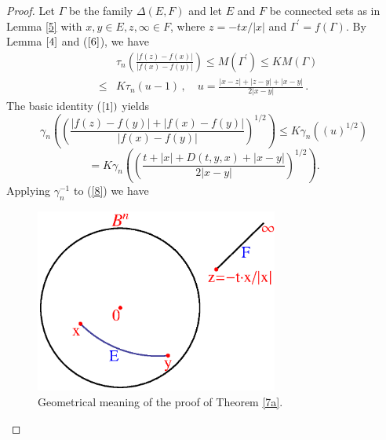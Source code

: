 \documentclass[12pt,a4paper,leqno]{amsart}
\theoremstyle{plain}
\numberwithin{equation}{section}          %
\begin{document}
\begin{proof}
Let $\Gamma$ be the family $\Delta(E,F)$ and let
$E$ and $F$ be
 connected sets as in Lemma \ref{5} with
$x,y\in E,z,\infty \in F$, where $z=-tx/|x|$ and $\Gamma^{'}=f(\Gamma)$.
By Lemma $\ref{4}$ and ($\ref{6}$), we have
\begin{eqnarray*}
& {} &\tau_n\left(\frac{|f(z)-f(x)|}{|f(x)-f(y)|}\right)\leq  M(\Gamma^{'})\leq KM(\Gamma)\\
                                                  &\leq & K\tau_n(u-1)\,, \quad
u=\displaystyle\frac{|x-z|+|z-y|+|x-y|}{2|x-y|}\,.
\end{eqnarray*}
The basic identity ($\ref{1})$ yields
\begin{equation}\label{8}
 \gamma_n\left(\left(\displaystyle\frac{|f(z)-f(y)|+|f(x)-f(y)|}{|f(x)-f(y)|}\right)^{1/2}\right)\leq
K\gamma_n\left(\left(u\right)^{1/2}\right)
\end{equation}
$$
=K\gamma_n\left(\left(\displaystyle\frac{t+|x|+D(t,y,x)+|x-y|}{2|x-y|}\right)^{1/2}\right).
$$
Applying $\gamma_n^{-1}$ to (\ref{8}) we have


\begin{figure}
\includegraphics[width=8cm]{thfigure.eps}
\caption{ Geometrical meaning of the proof of Theorem \ref{7a}.}
\end{figure}



\end{proof}
\end{document}
